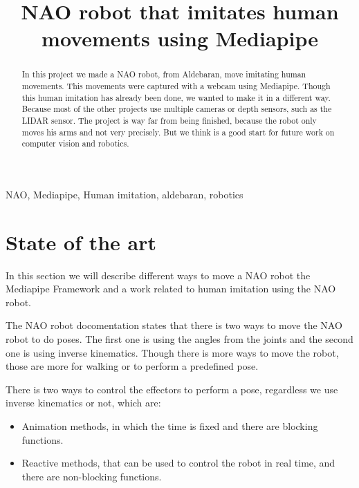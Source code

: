 \documentclass[conference]{IEEEtran}
\begin{document}
\title{NAO robot that imitates human movements using Mediapipe\\

}

\author{
}

\maketitle

\begin{abstract}
In this project we made a NAO robot, from Aldebaran, move imitating human movements. This movements were captured with a webcam using Mediapipe.
Though this human imitation has already been done, we wanted to make it in a different way. Because most of the other projects use multiple cameras or depth sensors, such as the LIDAR sensor. 
The project is way far from being finished, because the robot only moves his arms and not very precisely. But we think is a good start for future work on computer vision and robotics.
\end{abstract}

\begin{IEEEkeywords}
NAO, Mediapipe, Human imitation, aldebaran, robotics
\end{IEEEkeywords}
\section{State of the art}
In this section we will describe different ways to move a NAO robot the Mediapipe Framework and a work related to human imitation using the NAO robot.
 
The NAO robot docomentation  \cite{b1} states that there is two ways to move the NAO robot to do poses. The first one is using the angles from the joints and the second one is using inverse kinematics. Though there is more ways to move the robot, those are more for walking or to perform a predefined pose.

There is  two ways to control the effectors to perform a pose, regardless we use inverse kinematics or not, which are:
\begin{itemize}
    \item Animation methods, in which the time is fixed and there are blocking functions.
    \item Reactive methods, that can be used to control the robot in real time, and there are non-blocking functions.
\end{itemize}
\end{document}
